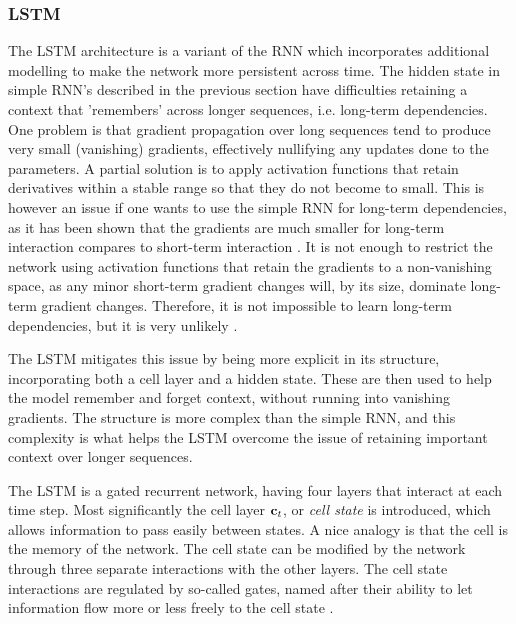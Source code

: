 \documentclass[a4paper,12pt]{article}
\begin{document}
\subsubsection{LSTM}
The LSTM architecture is a variant of the RNN which incorporates additional modelling to make the network more persistent across time. The hidden state in simple RNN's described in the previous section have difficulties retaining a context that 'remembers' across longer sequences, i.e. long-term dependencies. One problem is that gradient propagation over long sequences tend to produce very small (vanishing) gradients, effectively nullifying any updates done to the parameters. A partial solution is to apply activation functions that retain derivatives within a stable range so that they do not become to small. This is however an issue if one wants to use the simple RNN for long-term dependencies, as it has been shown that the gradients are much smaller for long-term interaction compares to short-term interaction \cite{Goodfellow-et-al-2016}. It is not enough to restrict the network using activation functions that retain the gradients to a non-vanishing space, as any minor short-term gradient changes will, by its size, dominate long-term gradient changes. Therefore, it is not impossible to learn long-term dependencies, but it is very unlikely \cite{Goodfellow-et-al-2016}.

The LSTM mitigates this issue by being more explicit in its structure, incorporating both a cell layer and a hidden state. These are then used to help the model remember and forget context, without running into vanishing gradients. The structure is more complex than the simple RNN, and this complexity is what helps the LSTM overcome the issue of retaining important context over longer sequences.


The LSTM is a gated recurrent network, having four layers that interact at each time step. Most significantly the cell layer $\mathbf{ c }_t$, or \textit{cell state} is introduced, which allows information to pass easily between states. A nice analogy is that the cell is the memory of the network. The cell state can be modified by the network through three separate interactions with the other layers. The cell state interactions are regulated by so-called gates, named after their ability to let information flow more or less freely to the cell state \cite{lstmwebsite}.
\end{document}
